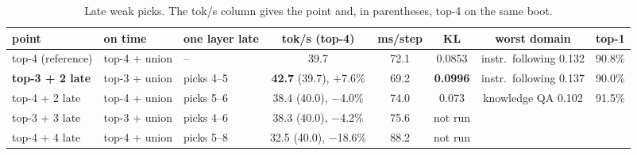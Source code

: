 \documentclass[11pt]{article}
\begin{document}
\begin{table}[h]
\centering\small
\caption{Late weak picks. The tok/s column gives the point and, in parentheses, top-4 on the same boot.}
\label{tab:late}
\setlength{\tabcolsep}{3.5pt}
\begin{adjustbox}{max width=\linewidth}
\begin{tabular}{lllccccc}
\toprule
point & on time & one layer late & tok/s (top-4) & ms/step & KL & worst domain & top-1 \\
\midrule
top-4 (reference) & top-4 + union & -- & 39.7 & 72.1 & 0.0853 & instr.\ following 0.132 & 90.8\% \\
\textbf{top-3 + 2 late} & top-3 + union & picks 4--5 & \textbf{42.7} (39.7), +7.6\% & 69.2 & \textbf{0.0996} & instr.\ following 0.137 & 90.0\% \\
top-4 + 2 late & top-4 + union & picks 5--6 & 38.4 (40.0), $-$4.0\% & 74.0 & 0.073 & knowledge QA 0.102 & 91.5\% \\
top-3 + 3 late & top-3 + union & picks 4--6 & 38.3 (40.0), $-$4.2\% & 75.6 & not run & & \\
top-4 + 4 late & top-4 + union & picks 5--8 & 32.5 (40.0), $-$18.6\% & 88.2 & not run & & \\
\bottomrule
\end{tabular}
\end{adjustbox}
\end{table}
\end{document}
